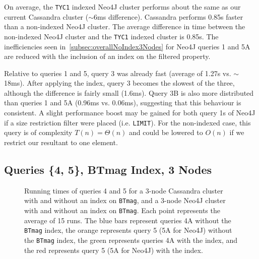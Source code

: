On average, the \texttt{TYC1} indexed Neo4J cluster performs about the same as our current Cassandra cluster
($\sim$6ms difference).
Cassandra performs 0.85s faster than a non-indexed Neo4J cluster.
The average difference in time between the non-indexed Neo4J cluster and the \texttt{TYC1} indexed cluster is 0.85s.
The inefficiencies seen in~\autoref{subsec:overallNoIndex3Nodes} for Neo4J queries 1 and 5A are reduced with the
inclusion of an index on the filtered property.

Relative to queries 1 and 5, query 3 was already fast (average of 1.27s vs. $\sim$18ms).
After applying the index, query 3 becomes the slowest of the three, although the difference is fairly small (1.6ms).
Query 3B is also more distributed than queries 1 and 5A (0.96ms vs. 0.06ms), suggesting that this behaviour is
consistent.
A slight performance boost may be gained for both query 1s of Neo4J if a size restriction filter were placed (i.e.
\texttt{LIMIT}).
For the non-indexed case, this query is of complexity $T(n) = \Theta(n)$ and could be lowered to $O(n)$ if we
restrict our resultant to one element.

\subsection{Queries \{4, 5\}, BTmag Index, 3 Nodes}\label{subsec:queries45btmagIndex3Nodes}
\begin{figure}
    \caption{Running times of queries 4 and 5 for a 3-node Cassandra cluster with and without an index on
    \texttt{BTmag}, and a 3-node Neo4J cluster with and without an index on \texttt{BTmag}.
    Each point represents the average of 15 runs.
    The blue bars represent queries 4A without the \texttt{BTmag} index, the orange represents query 5 (5A for Neo4J)
    without the \texttt{BTmag} index, the green represents queries 4A with the index, and the red represents query 5
    (5A for Neo4J) with the index.}\label{fig:45ni3}
\end{figure}

